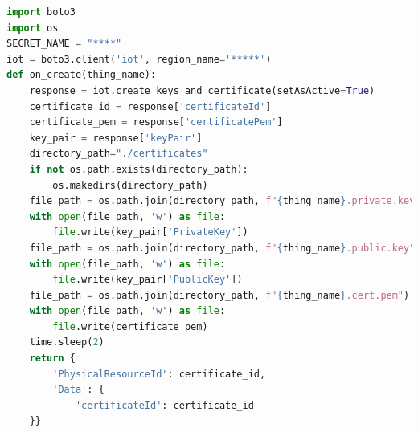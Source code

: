 \begin{lstlisting}[language=Python, caption={Code for the creation of \textit{AWS IoT Core Thing} certificates and keys}, label=lst:BotoIoTThingCert]
import boto3
import os
SECRET_NAME = "****"
iot = boto3.client('iot', region_name='*****')
def on_create(thing_name):
    response = iot.create_keys_and_certificate(setAsActive=True)
    certificate_id = response['certificateId']
    certificate_pem = response['certificatePem']
    key_pair = response['keyPair']
    directory_path="./certificates"
    if not os.path.exists(directory_path):
        os.makedirs(directory_path)
    file_path = os.path.join(directory_path, f"{thing_name}.private.key")
    with open(file_path, 'w') as file:
        file.write(key_pair['PrivateKey'])
    file_path = os.path.join(directory_path, f"{thing_name}.public.key")
    with open(file_path, 'w') as file:
        file.write(key_pair['PublicKey'])
    file_path = os.path.join(directory_path, f"{thing_name}.cert.pem")
    with open(file_path, 'w') as file:
        file.write(certificate_pem)
    time.sleep(2)
    return {
        'PhysicalResourceId': certificate_id,
        'Data': {
            'certificateId': certificate_id
    }}
\end{lstlisting}

